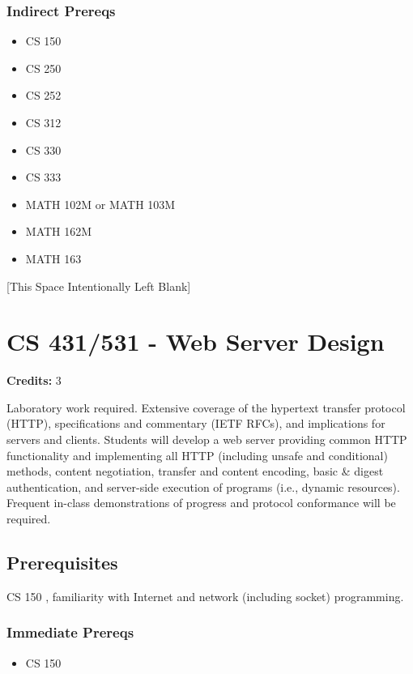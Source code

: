\documentclass[]{article}
\providecommand{\tightlist}{%
  \setlength{\itemsep}{0pt}\setlength{\parskip}{0pt}}
\newcommand{\pagebreakhere}{
\vspace*{\fill}
\begin{center}
[This Space Intentionally Left Blank]
\end{center}
\vspace*{\fill}
\newpage
}
\begin{document}
\subsubsection{Indirect Prereqs}\label{indirect-prereqs-21}

\begin{itemize}
\tightlist
\item
  CS 150
\item
  CS 250
\item
  CS 252
\item
  CS 312
\item
  CS 330
\item
  CS 333
\item
  MATH 102M or MATH 103M
\item
  MATH 162M
\item
  MATH 163
\end{itemize}

\pagebreakhere
\section{CS 431/531 - Web Server
Design}\label{cs-431531---web-server-design}

\textbf{Credits:} 3

Laboratory work required. Extensive coverage of the hypertext transfer
protocol (HTTP), specifications and commentary (IETF RFCs), and
implications for servers and clients. Students will develop a web server
providing common HTTP functionality and implementing all HTTP (including
unsafe and conditional) methods, content negotiation, transfer and
content encoding, basic \& digest authentication, and server-side
execution of programs (i.e., dynamic resources). Frequent in-class
demonstrations of progress and protocol conformance will be required.

\subsection{Prerequisites}\label{prerequisites-30}

CS 150 , familiarity with Internet and network (including socket)
programming.

\subsubsection{Immediate Prereqs}\label{immediate-prereqs-22}

\begin{itemize}
\tightlist
\item
  CS 150
\end{itemize}
\end{document}
